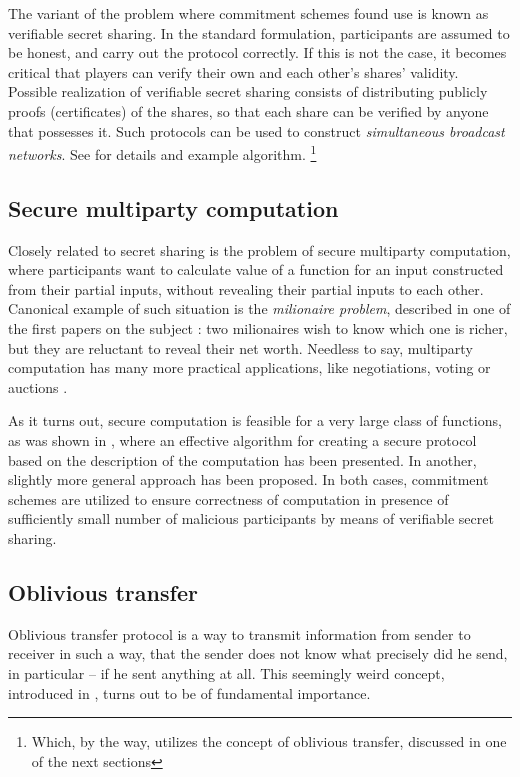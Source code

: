 \documentclass[10pt]{article}
\begin{document}
The variant of the problem where commitment schemes found use is known as verifiable secret sharing.
In the standard formulation, participants are assumed to be honest, and carry out the protocol correctly.
If this is not the case, it becomes critical that players can verify their own and each other's shares'
validity. Possible realization of verifiable secret sharing consists of distributing publicly proofs
(certificates) of the shares, so that each share can be verified by anyone that possesses it. Such
protocols can be used to construct \emph{simultaneous broadcast networks}. See \cite{VerifiableSharing}
for details and example algorithm. 
\footnote{Which, by the way, utilizes the concept of oblivious transfer, discussed in one of the next
sections}

\subsection{Secure multiparty computation}

Closely related to secret sharing is the problem of secure multiparty computation, where participants
want to calculate value of a function for an input constructed from their partial inputs, without
revealing their partial inputs to each other. Canonical example of such situation is the \emph{milionaire
problem}, described in one of the first papers on the subject \cite{Yao}: two milionaires wish to
know which one is richer, but they are reluctant to reveal their net worth. Needless to say, multiparty
computation has many more practical applications, like negotiations, voting or auctions \cite{grigoriev}.

As it turns out, secure computation is feasible for a very large class of functions, as was shown in
\cite{Goldreich87}, where an effective algorithm for creating a secure protocol based on the description
of the computation has been presented. In \cite{Chaum88} another, slightly more general approach has
been proposed. In both cases, commitment schemes are utilized to ensure correctness of computation in
presence of sufficiently small number of malicious participants by means of verifiable secret sharing. 

\subsection{Oblivious transfer}

Oblivious transfer protocol is a way to transmit information from sender to receiver in such a way,
that the sender does not know what precisely did he send, in particular -- if he sent anything at all.
This seemingly weird concept, introduced in \cite{Rabin81}, turns out to be of fundamental importance.
\end{document}
